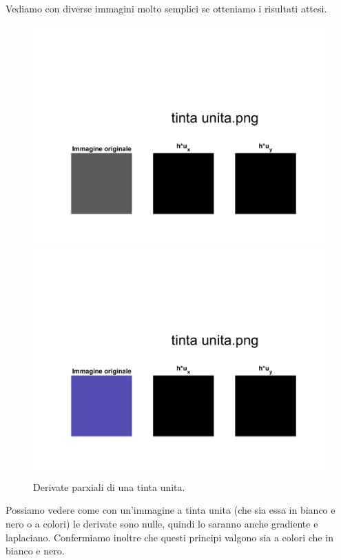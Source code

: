 \vspace{6em}
Vediamo con diverse immagini molto semplici se otteniamo i risultati attesi.\\

\begin{figure}[htb] 
\centering
\includegraphics[scale=0.4, trim = 0 0 0 10.5cm, clip]{Pictures/Risultati/tinta unita bianco e nero derivate parziali.png}
\includegraphics[scale=0.4, trim = 0 0 0 10.5cm, clip]{Pictures/Risultati/tinta unita derivate parziali.png}
\caption{Derivate parxiali di una tinta unita.}\label{fig:figura}
\end{figure}

Possiamo vedere come con un'immagine a tinta unita (che sia essa in bianco e nero o a colori) le derivate sono nulle, quindi lo saranno anche gradiente e laplaciano. Confermiamo inoltre che questi principi valgono sia a colori che in bianco e nero.\\

